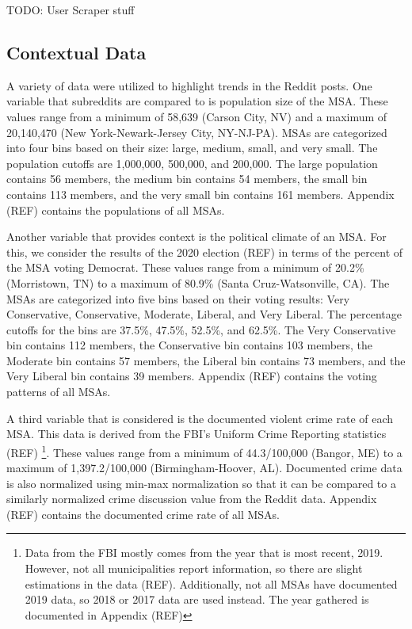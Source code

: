 \documentclass[12pt,oneside, letterpaper]{book}
\begin{document}
TODO: User Scraper stuff

\subsection{Contextual Data}
\par A variety of data were utilized to highlight trends in the Reddit posts. One variable that subreddits are compared to is population size of the MSA. These values range from a minimum of 58,639 (Carson City, NV) and a maximum of 20,140,470 (New York-Newark-Jersey City, NY-NJ-PA). MSAs are categorized into four bins based on their size: large, medium, small, and very small. The population cutoffs are 1,000,000, 500,000, and 200,000. The large population contains 56 members, the medium bin contains 54 members, the small bin contains 113 members, and the very small bin contains 161 members. Appendix (REF) contains the populations of all MSAs.

\par Another variable that provides context is the political climate of an MSA. For this, we consider the results of the 2020 election (REF) in terms of the percent of the MSA voting Democrat. These values range from a minimum of 20.2\% (Morristown, TN) to a maximum of 80.9\% (Santa Cruz-Watsonville, CA). The MSAs are categorized into five bins based on their voting results: Very Conservative, Conservative, Moderate, Liberal, and Very Liberal. The percentage cutoffs for the bins are 37.5\%, 47.5\%, 52.5\%, and 62.5\%. The Very Conservative bin contains 112 members, the Conservative bin contains 103 members, the Moderate bin contains 57 members, the Liberal bin contains 73 members, and the Very Liberal bin contains 39 members. Appendix (REF) contains the voting patterns of all MSAs.

\par A third variable that is considered is the documented violent crime rate of each MSA. This data is derived from the FBI's Uniform Crime Reporting statistics (REF) \footnote{Data from the FBI mostly comes from the year that is most recent, 2019. However, not all municipalities report information, so there are slight estimations in the data (REF). Additionally, not all MSAs have documented 2019 data, so 2018 or 2017 data are used instead. The year gathered is documented in Appendix (REF)}. These values range from a minimum of 44.3/100,000 (Bangor, ME) to a maximum of 1,397.2/100,000 (Birmingham-Hoover, AL). Documented crime data is also normalized using min-max normalization so that it can be compared to a similarly normalized crime discussion value from the Reddit data. Appendix (REF) contains the documented crime rate of all MSAs.
\end{document}
